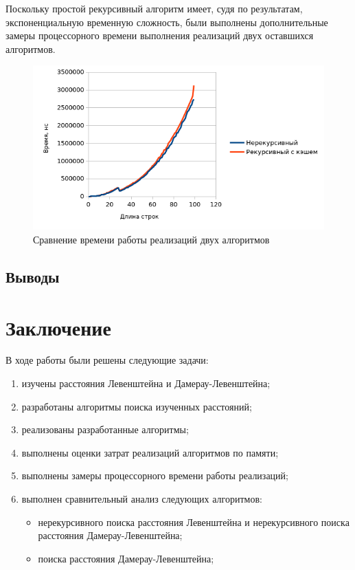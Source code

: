 \documentclass{report}
\begin{document}
Поскольку простой рекурсивный алгоритм имеет, судя по результатам,
экспоненциальную временную сложность, были выполнены дополнительные
замеры процессорного времени выполнения реализаций двух оставшихся
алгоритмов.

\begin{figure}[ht]
    \centering
    \includegraphics[width=\textwidth]{plt-02.png}
    \caption{Сравнение времени работы реализаций двух алгоритмов}
\end{figure}

\section{Выводы}

\chapter*{Заключение}

В ходе работы были решены следующие задачи:

\begin{enumerate}
    \item изучены расстояния Левенштейна и Дамерау-Левенштейна;
    \item разработаны алгоритмы поиска изученных расстояний;
    \item реализованы разработанные алгоритмы;
    \item выполнены оценки затрат реализаций алгоритмов по памяти;
    \item выполнены замеры процессорного времени работы реализаций;
    \item выполнен сравнительный анализ следующих алгоритмов:
    \begin{itemize}
        \item нерекурсивного поиска расстояния Левенштейна и
            нерекурсивного поиска расстояния Дамерау-Левенштейна;
        \item поиска расстояния Дамерау-Левенштейна;
    \end{itemize}
\end{enumerate}
\end{document}
